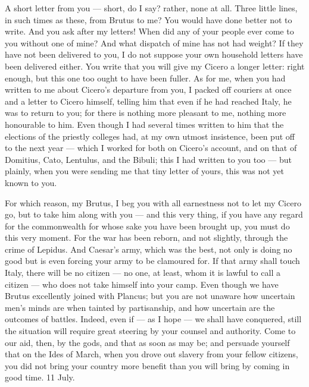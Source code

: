 

 A short letter from you --- short, do I say? rather, none at all. Three little lines, in such times as these, from Brutus to me? You would have done better not to write. And you ask after my letters! When did any of your people ever come to you without one of mine? And what dispatch of mine has not had weight? If they have not been delivered to you, I do not suppose your own household letters have been delivered either. You write that you will give my Cicero a longer letter: right enough, but this one too ought to have been fuller. As for me, when you had written to me about Cicero's departure from you, I packed off couriers at once and a letter to Cicero himself, telling him that even if he had reached Italy, he was to return to you; for there is nothing more pleasant to me, nothing more honourable to him. Even though I had several times written to him that the elections of the priestly colleges had, at my own utmost insistence, been put off to the next year --- which I worked for both on Cicero's account, and on that of Domitius, Cato, Lentulus, and the Bibuli; this I had written to you too --- but plainly, when you were sending me that tiny letter of yours, this was not yet known to you.

 For which reason, my Brutus, I beg you with all earnestness not to let my Cicero go, but to take him along with you --- and this very thing, if you have any regard for the commonwealth for whose sake you have been brought up, you must do this very moment. For the war has been reborn, and not slightly, through the crime of Lepidus. And Caesar's army, which was the best, not only is doing no good but is even forcing your army to be clamoured for. If that army shall touch Italy, there will be no citizen --- no one, at least, whom it is lawful to call a citizen --- who does not take himself into your camp. Even though we have Brutus excellently joined with Plancus; but you are not unaware how uncertain men's minds are when tainted by partisanship, and how uncertain are the outcomes of battles. Indeed, even if --- as I hope --- we shall have conquered, still the situation will require great steering by your counsel and authority. Come to our aid, then, by the gods, and that as soon as may be; and persuade yourself that on the Ides of March, when you drove out slavery from your fellow citizens, you did not bring your country more benefit than you will bring by coming in good time. 11 July.
